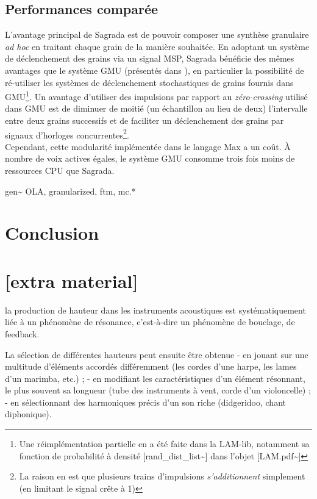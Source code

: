 \subsection{Performances comparée}

\noindent L'avantage principal de Sagrada est de pouvoir composer une synthèse granulaire \textit{ad hoc} en traitant chaque grain de la manière souhaitée. En adoptant un système de déclenchement des grains via un signal \gls{MSP}, Sagrada bénéficie des mêmes avantages que le système \gls{GMU} (présentés dans \cite{bascou_gmu_2005}), en particulier la possibilité de ré-utiliser les systèmes de déclenchement stochastiques de grains fournis dans \gls{GMU}\footnote{Une réimplémentation partielle en a été faite dans la LAM-lib, notamment sa fonction de probabilité à densité [rand\_dist\_list\textasciitilde{}] dans l'objet [LAM.pdf\textasciitilde{}]}. Un avantage d'utiliser des impulsions par rapport au \textit{zéro-crossing} utilisé dans GMU est de diminuer de moitié (un échantillon au lieu de deux) l'intervalle entre deux grains successifs et de faciliter un déclenchement des grains par signaux d'horloges concurrentes\footnote{La raison en est que plusieurs trains d'impulsions \textit{s'additionnent} simplement (en limitant le signal crête à 1)}.\\
\indent Cependant, cette modularité implémentée dans le langage Max a un coût. À nombre de voix actives égales, le système \gls{GMU} consomme trois fois moins de ressources \gls{CPU} que Sagrada.


gen\textasciitilde{ } OLA, granularized, ftm, mc.*

\section{Conclusion}



\section*{[extra material]}

la production de hauteur dans les instruments acoustiques est systématiquement liée à un phénomène de résonance, c'est-à-dire un phénomène de bouclage, de feedback. 

La sélection de différentes hauteurs peut ensuite être obtenue 
- en jouant sur une multitude d'éléments accordés différemment (les cordes d'une harpe, les lames
d'un marimba, etc.) ;
- en modifiant les caractéristiques d'un élément résonnant, le plus souvent sa longueur (tube des
instruments à vent, corde d'un violoncelle) ;
- en sélectionnant des harmoniques précis d'un son riche (didgeridoo, chant diphonique).


